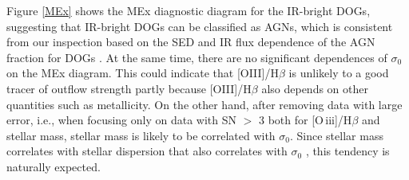 \documentclass[twocolumn]{aastex6}
\begin{document}
Figure \ref{MEx} shows the MEx diagnostic diagram for the IR-bright DOGs, suggesting that IR-bright DOGs can be classified as AGNs, which is consistent from our inspection based on the SED and IR flux dependence of the AGN fraction for DOGs \citep[see ][]{Toba_15,Toba_16}.
At the same time, there are no significant dependences of $\sigma_0$ on the MEx diagram.
This could indicate that [OIII]/H$\beta$ is unlikely to a good tracer of outflow strength partly because [OIII]/H$\beta$ also depends on other quantities such as metallicity.
On the other hand, after removing data with large error, i.e., when focusing only on data with SN $>$ 3 both for [O{\,\sc iii}]/H$\beta$ and stellar mass, stellar mass is likely to be correlated with $\sigma_0$.
Since stellar mass correlates with stellar dispersion that also correlates with $\sigma_0$ \citep{Woo}, this tendency is naturally expected.\\


\end{document}

